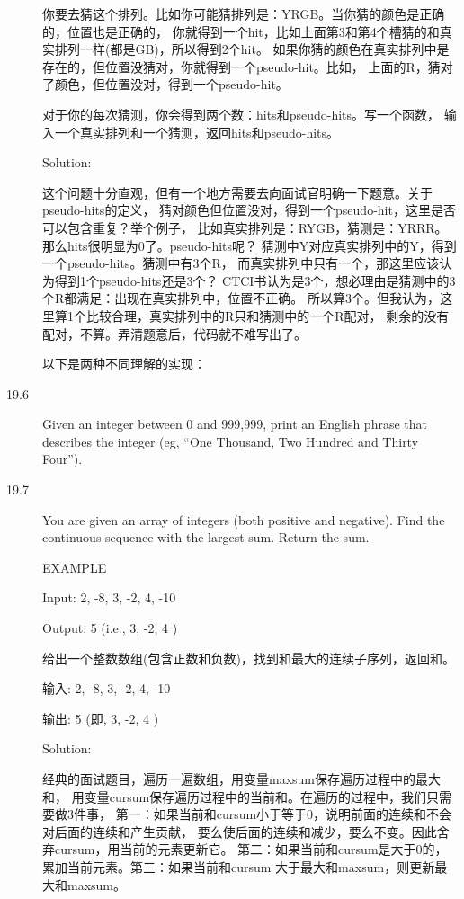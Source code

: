 \begin{description}
你要去猜这个排列。比如你可能猜排列是：YRGB。当你猜的颜色是正确的，位置也是正确的， 你就得到一个hit，比如上面第3和第4个槽猜的和真实排列一样(都是GB)，所以得到2个hit。 如果你猜的颜色在真实排列中是存在的，但位置没猜对，你就得到一个pseudo-hit。比如， 上面的R，猜对了颜色，但位置没对，得到一个pseudo-hit。

对于你的每次猜测，你会得到两个数：hits和pseudo-hits。写一个函数， 输入一个真实排列和一个猜测，返回hits和pseudo-hits。

Solution: 

这个问题十分直观，但有一个地方需要去向面试官明确一下题意。关于pseudo-hits的定义， 猜对颜色但位置没对，得到一个pseudo-hit，这里是否可以包含重复？举个例子， 比如真实排列是：RYGB，猜测是：YRRR。那么hits很明显为0了。pseudo-hits呢？ 猜测中Y对应真实排列中的Y，得到一个pseudo-hits。猜测中有3个R， 而真实排列中只有一个，那这里应该认为得到1个pseudo-hits还是3个？ CTCI书认为是3个，想必理由是猜测中的3个R都满足：出现在真实排列中，位置不正确。 所以算3个。但我认为，这里算1个比较合理，真实排列中的R只和猜测中的一个R配对， 剩余的没有配对，不算。弄清题意后，代码就不难写出了。

以下是两种不同理解的实现：



\item[19.6] Given an integer between 0 and 999,999, print an English phrase that describes the integer (eg, “One Thousand, Two Hundred and Thirty Four”).	
%


\item[19.7] You are given an array of integers (both positive and negative). Find the continuous sequence with the largest sum. Return the sum.

EXAMPLE

Input: {2, -8, 3, -2, 4, -10}

Output: 5 (i.e., {3, -2, 4} )

给出一个整数数组(包含正数和负数)，找到和最大的连续子序列，返回和。

输入: {2, -8, 3, -2, 4, -10}

输出: 5 (即, {3, -2, 4} )

Solution: 

经典的面试题目，遍历一遍数组，用变量maxsum保存遍历过程中的最大和， 用变量cursum保存遍历过程中的当前和。在遍历的过程中，我们只需要做3件事， 第一：如果当前和cursum小于等于0，说明前面的连续和不会对后面的连续和产生贡献， 要么使后面的连续和减少，要么不变。因此舍弃cursum，用当前的元素更新它。 第二：如果当前和cursum是大于0的，累加当前元素。第三：如果当前和cursum 大于最大和maxsum，则更新最大和maxsum。


\end{description}
